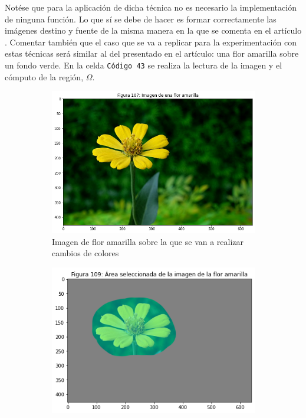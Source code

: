 \documentclass[11pt,twoside,titlepage,a4paper]{article}
\numberwithin{equation}{section} %
\theoremstyle{usual}
\begin{document}
Notése que para la aplicación de dicha técnica no es necesario la implementación de ninguna función. Lo que sí se debe de hacer es formar correctamente las imágenes destino y fuente de la misma manera en la que se comenta en el artículo \cite{poissonImageEditing}. Comentar también que el caso que se va a replicar para la experimentación con estas técnicas será similar al del presentado en el artículo: una flor amarilla sobre un fondo verde. En la celda \texttt{Código 43} se realiza la lectura de la imagen y el cómputo de la región, $\Omega$.

\begin{figure}[h]
    \centering
    \begin{subfigure}[t]{.45\textwidth}
        \centering
        \includegraphics[width=\textwidth]{imagenes/PoissonImageEditing_cell_107_output_0.png}
        \caption{Imagen de flor amarilla sobre la que se van a realizar cambios de colores}
        \label{fig:florAmarilla}
    \end{subfigure}%
    \centering
    \begin{subfigure}[t]{.45\textwidth}
        \centering
        \includegraphics[width=\textwidth]{imagenes/PoissonImageEditing_cell_107_output_2.png}

\end{subfigure}
\end{figure}
\end{document}
